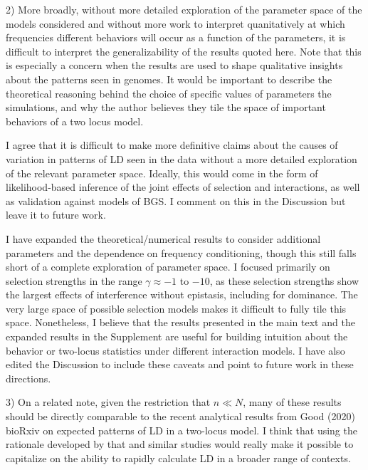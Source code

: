 \documentclass{article}
\newenvironment{response}%
  {\list{}{\leftmargin=0.5in\rightmargin=0.5in\color{blue}}\item[]}%
  {\endlist}
\begin{document}
2) More broadly, without more detailed exploration of the parameter space of
the models considered and without more work to interpret quanitatively at which
frequencies different behaviors will occur as a function of the parameters, it
is difficult to interpret the generalizability of the results quoted here. Note
that this is especially a concern when the results are used to shape
qualitative insights about the patterns seen in genomes. It would be important
to describe the theoretical reasoning behind the choice of specific values of
parameters the simulations, and why the author believes they tile the space of
important behaviors of a two locus model.

\begin{response}
    I agree that it is difficult to make more definitive claims about the
    causes of variation in patterns of LD seen in the data without a more
    detailed exploration of the relevant parameter space. Ideally, this would
    come in the form of likelihood-based inference of the joint effects of 
    selection and interactions, as well as validation against models of BGS.
    I comment on this in the Discussion but leave it to future work.

    I have expanded the theoretical/numerical results to consider additional
    parameters and the dependence on frequency conditioning, though this still
    falls short of a complete exploration of parameter space. I focused primarily
    on selection strengths in the range $\gamma\approx -1$ to $-10$, as these
    selection strengths show the largest effects of interference without 
    epistasis, including for dominance. The very large space of possible selection
    models makes it difficult to fully tile this space. Nonetheless, I
    believe that the results presented in the main text and the expanded results
    in the Supplement are useful for building intuition about the behavior or
    two-locus statistics under different interaction models.
    I have also edited the Discussion to include these caveats and
    point to future work in these directions.
\end{response}

3) On a related note, given the restriction that $n \ll N$, many of these
results should be directly comparable to the recent analytical results from
Good (2020) bioRxiv on expected patterns of LD in a two-locus model. I think
that using the rationale developed by that and similar studies would really
make it possible to capitalize on the ability to rapidly calculate LD in a
broader range of contexts.
\end{document}
